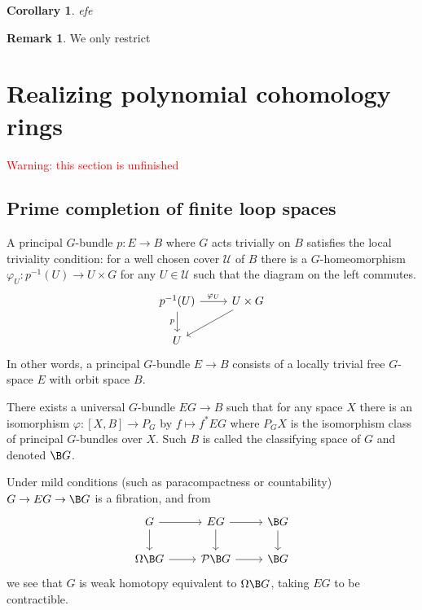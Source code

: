\documentclass[psamsfonts]{amsart}
\newtheorem{cor}{Corollary}[section]
\theoremstyle{definition}
\newtheorem{rem}{Remark}[section]
\numberwithin{equation}{section}
\begin{document}
\begin{cor}
efe
\end{cor}

\begin{rem}
We only restrict
\end{rem}


\section{Realizing polynomial cohomology rings}

\textcolor{red}{Warning: this section is unfinished}

\subsection{Prime completion of finite loop spaces}

A principal $G$-bundle $p:E\to B$ where $G$ acts trivially on $B$ satisfies the local triviality condition: for a well chosen cover $\mathcal{U}$ of $B$ there is a $G$-homeomorphism $\varphi_U:p^{-1}(U)\to U\times G$ for any $U\in\mathcal{U}$ such that the diagram on the left commutes.
\[\begin{tikzcd}
p^{-1}(U)\arrow[d,"p"']\arrow[r,"\varphi_U"]&U\times G\arrow[dl]\\
U
\end{tikzcd}\]
In other words, a principal $G$-bundle $E\to B$ consists of a locally trivial free $G$-space $E$ with orbit space $B$.

There exists a universal $G$-bundle $EG\to B$ such that for any space $X$ there is an isomorphism $\varphi:[X,B]\to P_G$ by $f\mapsto f^\ast EG$ where $P_GX$ is the isomorphism class of principal $G$-bundles over $X$. Such $B$ is called the classifying space of $G$ and denoted $\B G$.

Under mild conditions (such as paracompactness or countability) $G\to EG\to\B G$ is a fibration, and from
\[\begin{tikzcd}
G\arrow[r]\arrow[d]&EG\arrow[r]\arrow[d]&\B G\arrow[d]\\
\Omega\B G\arrow[r]&\mathcal{P}\B G\arrow[r]&\B G
\end{tikzcd}\]
we see that $G$ is weak homotopy equivalent to $\Omega\B G$, taking $EG$ to be contractible.
\end{document}
